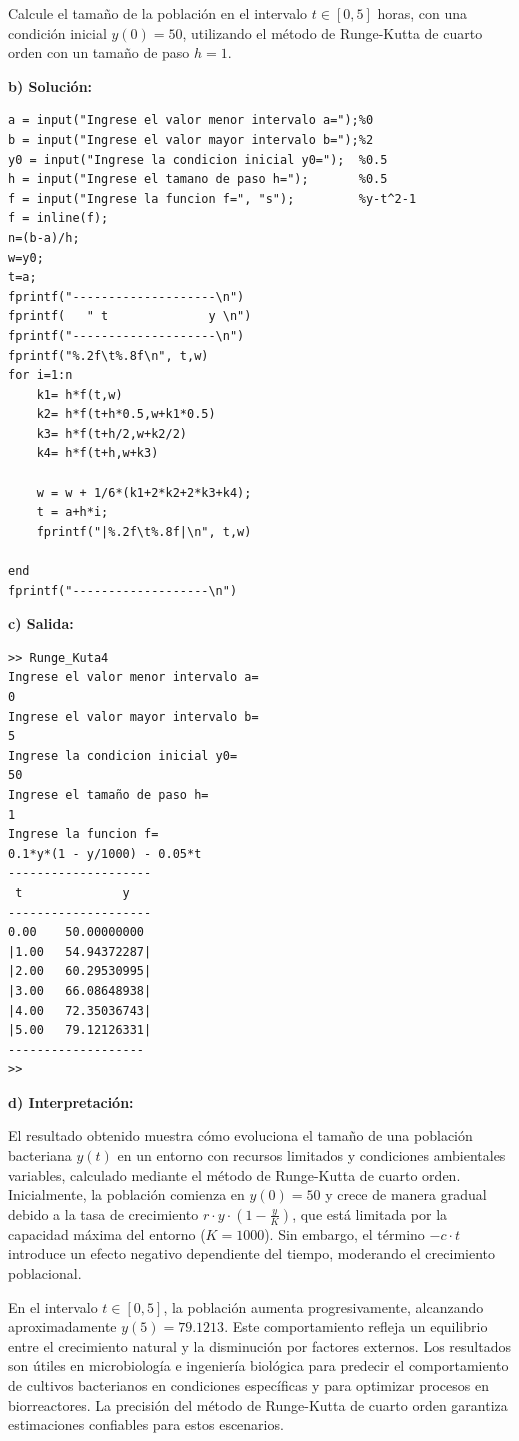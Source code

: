 \documentclass[12pt,a4paper,twoside]{article}  %
\begin{document}
Calcule el tamaño de la población en el intervalo \( t \in [0, 5] \) horas, con una condición inicial \( y(0) = 50 \), utilizando el método de Runge-Kutta de cuarto orden con un tamaño de paso \( h = 1 \).

\textbf{b) Solución:}

\begin{lstlisting}
a = input("Ingrese el valor menor intervalo a=");%0
b = input("Ingrese el valor mayor intervalo b=");%2
y0 = input("Ingrese la condicion inicial y0=");  %0.5
h = input("Ingrese el tamano de paso h=");       %0.5
f = input("Ingrese la funcion f=", "s");         %y-t^2-1
f = inline(f);
n=(b-a)/h;
w=y0;
t=a;
fprintf("--------------------\n")
fprintf(   " t              y \n")
fprintf("--------------------\n")
fprintf("%.2f\t%.8f\n", t,w)
for i=1:n
    k1= h*f(t,w)
    k2= h*f(t+h*0.5,w+k1*0.5)
    k3= h*f(t+h/2,w+k2/2)
    k4= h*f(t+h,w+k3)

    w = w + 1/6*(k1+2*k2+2*k3+k4);
    t = a+h*i;
    fprintf("|%.2f\t%.8f|\n", t,w)
    
end
fprintf("-------------------\n")
\end{lstlisting}

\textbf{c) Salida:}

\begin{verbatim}
>> Runge_Kuta4
Ingrese el valor menor intervalo a=
0
Ingrese el valor mayor intervalo b=
5
Ingrese la condicion inicial y0=
50
Ingrese el tamaño de paso h=
1
Ingrese la funcion f=
0.1*y*(1 - y/1000) - 0.05*t
--------------------
 t              y 
--------------------
0.00	50.00000000
|1.00	54.94372287|
|2.00	60.29530995|
|3.00	66.08648938|
|4.00	72.35036743|
|5.00	79.12126331|
-------------------
>> 
\end{verbatim}

\textbf{d) Interpretación:}

El resultado obtenido muestra cómo evoluciona el tamaño de una población bacteriana \( y(t) \) en un entorno con recursos limitados y condiciones ambientales variables, calculado mediante el método de Runge-Kutta de cuarto orden. Inicialmente, la población comienza en \( y(0) = 50 \) y crece de manera gradual debido a la tasa de crecimiento \( r \cdot y \cdot \left(1 - \frac{y}{K}\right) \), que está limitada por la capacidad máxima del entorno (\( K = 1000 \)). Sin embargo, el término \(-c \cdot t\) introduce un efecto negativo dependiente del tiempo, moderando el crecimiento poblacional.

En el intervalo \( t \in [0, 5] \), la población aumenta progresivamente, alcanzando aproximadamente \( y(5) = 79.1213 \). Este comportamiento refleja un equilibrio entre el crecimiento natural y la disminución por factores externos. Los resultados son útiles en microbiología e ingeniería biológica para predecir el comportamiento de cultivos bacterianos en condiciones específicas y para optimizar procesos en biorreactores. La precisión del método de Runge-Kutta de cuarto orden garantiza estimaciones confiables para estos escenarios.
\end{document}
